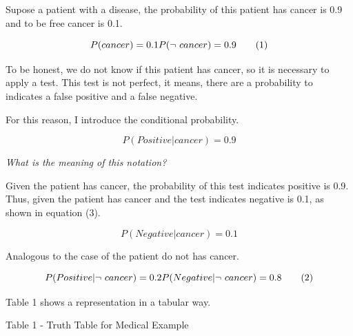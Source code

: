 \documentclass[]{book}
\begin{document}
Supose a patient with a disease, the probability of this patient has
cancer is 0.9 and to be free cancer is 0.1.

\[P(cancer) = 0.1 \\
  P(\neg \ cancer) = 0.9 \tag{1}\]

To be honest, we do not know if this patient has cancer, so it is
necessary to apply a test. This test is not perfect, it means, there are
a probability to indicates a false positive and a false negative.

For this reason, I introduce the conditional probability.

\[ P(Positive | cancer) = 0.9 \tag{2}\]

\emph{What is the meaning of this notation?}

Given the patient has cancer, the probability of this test indicates
positive is 0.9. Thus, given the patient has cancer and the test
indicates negative is 0.1, as shown in equation (3).

\[ P(Negative | cancer) = 0.1 \tag{3}\]

Analogous to the case of the patient do not has cancer.

\[ P(Positive | \neg \ cancer) = 0.2 \\
   P(Negative | \neg \ cancer) = 0.8 \tag{2} \]

Table 1 shows a representation in a tabular way.

Table 1 - Truth Table for Medical Example
\end{document}
